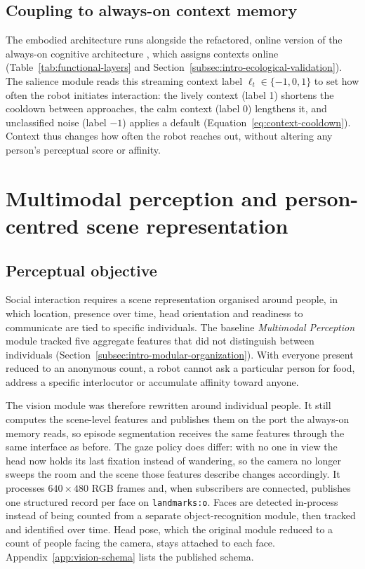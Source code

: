 \subsection{Coupling to always-on context memory}
\label{subsec:developmental-context-coupling}

The embodied architecture runs alongside the refactored, online version of the always-on cognitive architecture \citep{Pasquali2025AlwaysOn}, which assigns contexts online (Table~\ref{tab:functional-layers} and Section~\ref{subsec:intro-ecological-validation}). The salience module reads this streaming context label $\ell_t \in \{-1, 0, 1\}$ to set how often the robot initiates interaction: the lively context (label 1) shortens the cooldown between approaches, the calm context (label 0) lengthens it, and unclassified noise (label $-1$) applies a default (Equation~\ref{eq:context-cooldown}). Context thus changes how often the robot reaches out, without altering any person's perceptual score or affinity.

\section{Multimodal perception and person-centred scene representation}
\label{sec:multimodal-perception}

\subsection{Perceptual objective}
\label{subsec:perceptual-objective}

Social interaction requires a scene representation organised around people, in which location, presence over time, head orientation and readiness to communicate are tied to specific individuals. The baseline \emph{Multimodal Perception} module \citep{Pasquali2024ArtificialCognition,Pasquali2025AlwaysOn} tracked five aggregate features that did not distinguish between individuals (Section~\ref{subsec:intro-modular-organization}). With everyone present reduced to an anonymous count, a robot cannot ask a particular person for food, address a specific interlocutor or accumulate affinity toward anyone.

The vision module was therefore rewritten around individual people. It still computes the scene-level features and publishes them on the port the always-on memory reads, so episode segmentation receives the same features through the same interface as before. The gaze policy does differ: with no one in view the head now holds its last fixation instead of wandering, so the camera no longer sweeps the room and the scene those features describe changes accordingly. It processes $640\times480$ RGB frames and, when subscribers are connected, publishes one structured record per face on \texttt{landmarks:o}. Faces are detected in-process instead of being counted from a separate object-recognition module, then tracked and identified over time. Head pose, which the original module reduced to a count of people facing the camera, stays attached to each face. Appendix~\ref{app:vision-schema} lists the published schema.

